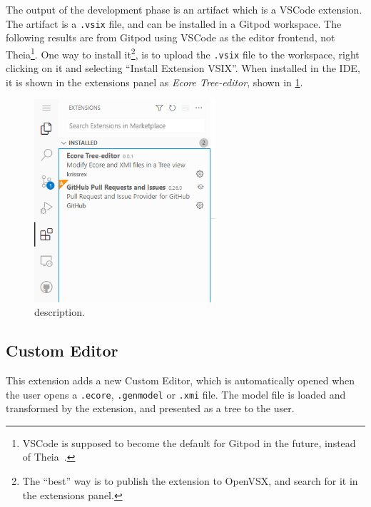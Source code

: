 The output of the development phase is an artifact which is a \gls{VSCode} extension.
The artifact is a \texttt{.vsix} file, and can be installed in a \gls{Gitpod} workspace.
The following results are from \gls{Gitpod} using \gls{VSCode} as the editor frontend, not \gls{Theia}\footnote{VSCode is supposed to become the default for Gitpod in the future, instead of Theia~\cite{georgetsiolisMenuEntryGitpod2019}.}.
One way to install it\footnote{The ``best'' way is to publish the extension to OpenVSX, and search for it in the extensions panel.}, is to upload the \texttt{.vsix} file to the workspace, right clicking on it and selecting ``Install Extension VSIX''.
When installed in the \acrshort{IDE}, it is shown in the extensions panel as \textit{Ecore Tree-editor}, shown in \cref{fig:gitpod-ext-installed}.

\begin{figure}[htbp]  %
  \centering
  \includegraphics[width=0.6\textwidth]{figures/gitpod-vscode-extensions-installed.png}
  \caption[title]{description.}\label{fig:gitpod-ext-installed}
\end{figure}

\subsection{Custom Editor}

This extension adds a new Custom Editor, which is automatically opened when the user opens a \texttt{.ecore}, \texttt{.genmodel} or \texttt{.xmi} file.
The model file is loaded and transformed by the extension, and presented as a tree to the user.

